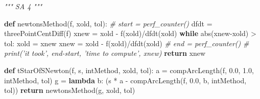 \documentclass[11pt]{article}
\newenvironment{Shaded}{}{}
\newcommand{\KeywordTok}[1]{\textcolor[rgb]{0.00,0.44,0.13}{\textbf{{#1}}}}
\newcommand{\FloatTok}[1]{\textcolor[rgb]{0.25,0.63,0.44}{{#1}}}
\newcommand{\CommentTok}[1]{\textcolor[rgb]{0.38,0.63,0.69}{\textit{{#1}}}}
\newcommand{\NormalTok}[1]{{#1}}
\newcommand{\ControlFlowTok}[1]{\textcolor[rgb]{0.00,0.44,0.13}{\textbf{{#1}}}}
\newcommand{\OperatorTok}[1]{\textcolor[rgb]{0.40,0.40,0.40}{{#1}}}
\newcommand{\BuiltInTok}[1]{{#1}}
\begin{document}
\begin{Shaded}
\begin{Highlighting}[]
\CommentTok{""" SA 4 """}

\KeywordTok{def}\NormalTok{ newtonsMethod(f, xold, tol):}
\CommentTok{#    start = perf_counter()}
\NormalTok{    dfdt }\OperatorTok{=}\NormalTok{ threePointCentDiff(f)}
\NormalTok{    xnew }\OperatorTok{=}\NormalTok{ xold }\OperatorTok{-}\NormalTok{ f(xold)}\OperatorTok{/}\NormalTok{dfdt(xold)}
    \ControlFlowTok{while} \BuiltInTok{abs}\NormalTok{(xnew}\OperatorTok{-}\NormalTok{xold) }\OperatorTok{>}\NormalTok{ tol:}
\NormalTok{        xold }\OperatorTok{=}\NormalTok{ xnew}
\NormalTok{        xnew }\OperatorTok{=}\NormalTok{ xold }\OperatorTok{-}\NormalTok{ f(xold)}\OperatorTok{/}\NormalTok{dfdt(xold)}
\CommentTok{#    end = perf_counter()}
\CommentTok{#    print('it took', end-start, 'time to compute', xnew)}
    \ControlFlowTok{return}\NormalTok{ xnew}

\KeywordTok{def}\NormalTok{ tStarOfSNewton(f, s, intMethod, xold, tol):}
\NormalTok{    a }\OperatorTok{=}\NormalTok{ compArcLength(f, }\FloatTok{0.0}\NormalTok{, }\FloatTok{1.0}\NormalTok{, intMethod, tol)}
\NormalTok{    g }\OperatorTok{=} \KeywordTok{lambda}\NormalTok{ b: (s }\OperatorTok{*}\NormalTok{ a }\OperatorTok{-}\NormalTok{ compArcLength(f, }\FloatTok{0.0}\NormalTok{, b, intMethod, tol))}
    \ControlFlowTok{return}\NormalTok{ newtonsMethod(g, xold, tol)}




\end{Highlighting}
\end{Shaded}
\end{document}
